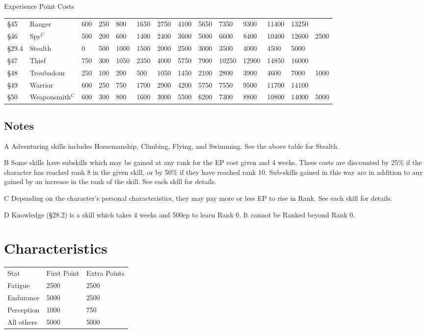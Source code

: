 \begin{Table}{Experience Point Costs}
\begin{tabularx}{\linewidth}{llllllllllllll}
§45	& Ranger		& 600	& 250	& 800	& 1650	& 2750	& 4100	& 5650	& 7350	& 9300	& 11400	& 13250	&	\\
§46	& Spy$^C$		& 500	& 200	& 600	& 1400	& 2400	& 3600	& 5000	& 6600	& 8400	& 10400	& 12600	& 2500	\\
§29.4	& Stealth		& 0	& 500	& 1000	& 1500	& 2000	& 2500	& 3000	& 3500	& 4000	& 4500	& 5000	&	\\
§47	& Thief			& 750	& 300	& 1050	& 2350	& 4000	& 5750	& 7900	& 10250	& 12900	& 14850	& 16000	& 	\\
§48	& Troubadour		& 250	& 100	& 200	& 500	& 1050	& 1450	& 2100	& 2800	& 3900	& 4600	& 7000	& 1000	\\
§49	& Warrior		& 600	& 250	& 750	& 1700	& 2900	& 4200	& 5750	& 7550	& 9500	& 11700	& 14100	& 	\\
§50	& Weaponsmith$^C$	& 600	& 300	& 800	& 1600	& 3000	& 5500	& 6200	& 7300	& 8800	& 10800	& 14000	& 5000	\\
\end{tabularx}

\subsection{Notes}

\begin{Description}
\item[A] Adventuring skills includes Horsemanship, Climbing, Flying, and
Swimming. See the above table for Stealth.

\item[B] Some skills have subskills which may be gained at any rank
  for the EP cost given and 4 weeks.  These costs are discounted by
  25\% if the character has reached rank 8 in the given skill, or by
  50\% if they have reached rank 10. Sub-skills gained in this way are
  in addition to any gained by an increase in the rank of the
  skill. See each skill for details.

\item[C] Depending on the character’s personal characteristics, they
  may pay more or less EP to rise in Rank. See each skill for details.

\item[D] Knowledge (§28.2) is a skill which takes 4 weeks and 500ep to
  learn Rank 0.  It cannot be Ranked beyond Rank 0.
\end{Description}


\section{Characteristics}

\begin{tabularx}{\linewidth}{XXX}
Stat		& First Point	& Extra Points  \\
Fatigue		& 2500		& 2500 \\
Endurance	& 5000		& 2500 \\
Perception	& 1000		& 750 \\
All others	& 5000		& 5000 \\
\end{tabularx}
\end{Table}
